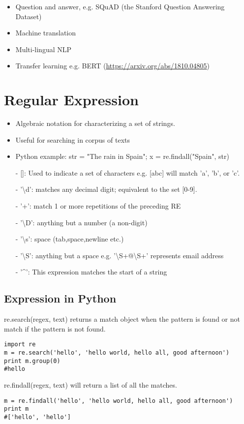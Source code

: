 \documentclass[12pt, oneside]{article}
\begin{document}
\begin{itemize}
\item Question and answer, e.g. SQuAD (the Stanford Question Answering Dataset)
\item Machine translation
\item Multi-lingual NLP
\item Transfer learning e.g. BERT (\url {https://arxiv.org/abs/1810.04805})
\end{itemize}



\section{Regular Expression}


\begin{itemize}
\item Algebraic notation for characterizing a set of strings.
\item Useful for searching in corpus of texts
\item Python example: str = "The rain in Spain"; x = re.findall("Spain", str)
\end{itemize}





\begin{itemize}
\item[-][]: Used to indicate a set of characters e.g. [abc] will match 'a', 'b', or 'c'.
\item[-]'\textbackslash d': matches any decimal digit; equivalent to the set [0-9].
\item[-] '+': match 1 or more repetitions of the preceding RE
\item[-]'\textbackslash D': anything but a number (a non-digit)	
\item[-] '\textbackslash s': space (tab,space,newline etc.)
\item[-] '\textbackslash S': anything but a space e.g. '\textbackslash S+@\textbackslash S+' represents email address
\item[-]'\textasciicircum': This expression matches the start of a string
\end{itemize}



\subsection{Expression in Python}
re.search(regex, text) returns a match object when the pattern is found or not match if the pattern is not found.
\begin{lstlisting}
import re
m = re.search('hello', 'hello world, hello all, good afternoon')
print m.group(0)
#hello
\end{lstlisting}

re.findall(regex, text) will return a list of all the matches.
\begin{lstlisting}
m = re.findall('hello', 'hello world, hello all, good afternoon')
print m
#['hello', 'hello']
\end{lstlisting}
\end{document}
